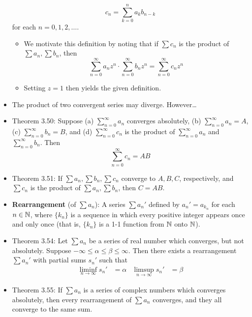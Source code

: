 \documentclass[../../notes.tex]{subfiles}
\begin{document}
\begin{itemize}
    \begin{equation*}
        c_n = \sum_{k=0}^na_kb_{n-k}
    \end{equation*}
    for each $n=0,1,2,\dots$.
    \begin{itemize}
        \item We motivate this definition by noting that if $\sum c_n$ is the product of $\sum a_n,\sum b_n$, then
        \begin{equation*}
            \sum_{n=0}^\infty a_nz^n\cdot\sum_{n=0}^\infty b_nz^n = \sum_{n=0}^\infty c_nz^n
        \end{equation*}
        \item Setting $z=1$ then yields the given definition.
    \end{itemize}
    \item The product of two convergent series may diverge. However\dots
    \item Theorem 3.50: Suppose (a) $\sum_{n=0}^\infty a_n$ converges absolutely, (b) $\sum_{n=0}^\infty a_n=A$, (c) $\sum_{n=0}^\infty b_n=B$, and (d) $\sum_{n=0}^\infty c_n$ is the product of $\sum_{n=0}^\infty a_n$ and $\sum_{n=0}^\infty b_n$. Then
    \begin{equation*}
        \sum_{n=0}^\infty c_n = AB
    \end{equation*}
    \item Theorem 3.51: If $\sum a_n,\sum b_n,\sum c_n$ converge to $A,B,C$, respectively, and $\sum c_n$ is the product of $\sum a_n,\sum b_n$, then $C=AB$.
    \item \textbf{Rearrangement} (of $\sum a_n$): A series $\sum a_n'$ defined by $a_n'=a_{k_n}$ for each $n\in\mathbb{N}$, where $\{k_n\}$ is a sequence in which every positive integer appears once and only once (that is, $\{k_n\}$ is a 1-1 function from $\mathbb{N}$ onto $\mathbb{N}$).
    \item Theorem 3.54: Let $\sum a_n$ be a series of real number which converges, but not absolutely. Suppose $-\infty\leq\alpha\leq\beta\leq\infty$. Then there exists a rearrangement $\sum a_n'$ with partial sums $s_n'$ such that
    \begin{align*}
        \liminf_{n\to\infty}s_n' &= \alpha&
        \limsup_{n\to\infty}s_n' &= \beta
    \end{align*}
    \item Theorem 3.55: If $\sum a_n$ is a series of complex numbers which converges absolutely, then every rearrangement of $\sum a_n$ converges, and they all converge to the same sum.
\end{itemize}
\end{document}
